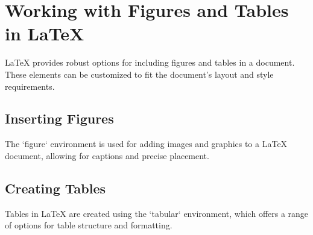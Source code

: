 \section{Working with Figures and Tables in LaTeX}
\label{sec:figures-tables}

LaTeX provides robust options for including figures and tables in a document. These elements can be customized to fit the document's layout and style requirements.

\subsection{Inserting Figures}
The `figure` environment is used for adding images and graphics to a LaTeX document, allowing for captions and precise placement.

\subsection{Creating Tables}
Tables in LaTeX are created using the `tabular` environment, which offers a range of options for table structure and formatting.
